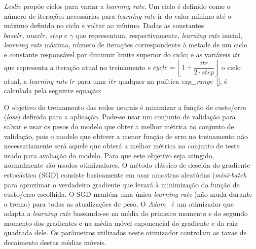 \textit{Leslie} propõe ciclos para variar a \textit{learning rate}. Um ciclo é definido como o número de iterações necessárias para \textit{learning rate} ir do valor mínimo até o máximo definido no ciclo e voltar ao mínimo. Dadas as constantes $baselr,\, maxlr,\, step \text{ e } \gamma$ que representam, respectivamente, \textit{learning rate} inicial, \textit{learning rate} máxima, número de iterações correspondente à metade de um ciclo e constante responsável por diminuir limite superior do ciclo; e as variáveis $itr$ que representa a iteração atual no treinamento e $cycle = \left\lfloor1 + \dfrac{itr}{2 \cdot step}\right\rfloor$ o ciclo atual, a \textit{learning rate} $lr$ para uma $itr$ qualquer na política \textit{exp\_range}~[], é calculada pela seguinte equação:

O objetivo do treinamento das redes neurais é minimizar a função de custo/erro (\textit{loss}) definida para a aplicação. Pode-se usar um conjunto de validação para salvar e usar os pesos do modelo que obter a melhor métrica no conjunto de validação, pois o modelo que obtiver a menor função de erro no treinamento não necessariamente será aquele que obterá a melhor métrica no conjunto de teste usado para avaliação do modelo. Para que este objetivo seja atingido, normalmente são usados otimizadores. O método clássico de descida do gradiente estocástico (\acrshort{SGD}) consiste basicamente em usar amostras aleatórias (\textit{mini-batch} para aproximar o verdadeiro gradiente que levará à minimização da função de custo/erro escolhida. O \acrshort{SGD} mantém uma única \textit{learning rate} (não muda durante o treino) para todas as atualizações de peso. O \textit{Adam}~\cite{kingma2014adam} é um otimizador que adapta a \textit{learning rate} baseando-se na média do primeiro momento e do segundo momento dos gradientes e na média móvel exponencial do gradiente e da raiz quadrada dele. Os parâmetros utilizados neste otimizador controlam as taxas de decaimento destas médias móveis.

